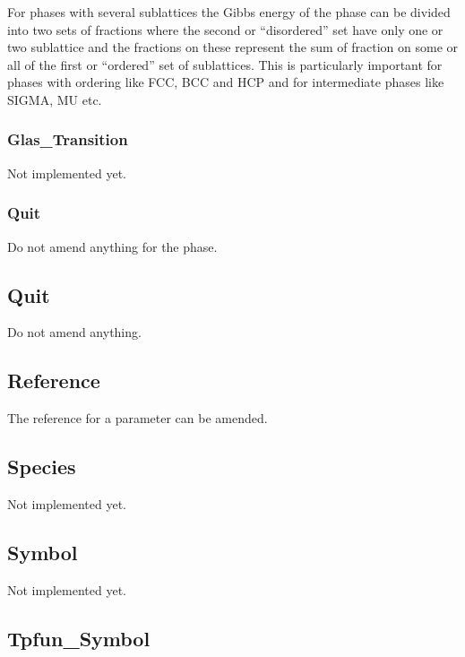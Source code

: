 \documentclass[12pt]{article}
\begin{document}
For phases with several sublattices the Gibbs energy of the phase can
be divided into two sets of fractions where the second or
``disordered'' set have only one or two sublattice and the fractions
on these represent the sum of fraction on some or all of the first or
``ordered'' set of sublattices.  This is particularly important for
phases with ordering like FCC, BCC and HCP and for intermediate phases
like SIGMA, MU etc.

\subsubsection{Glas\_Transition}

Not implemented yet.

\subsubsection{Quit}

Do not amend anything for the phase.

\subsection{Quit}

Do not amend anything.

\subsection{Reference}

The reference for a parameter can be amended.

\subsection{Species}

Not implemented yet.

\subsection{Symbol}

Not implemented yet.

\subsection{Tpfun\_Symbol}
\end{document}
